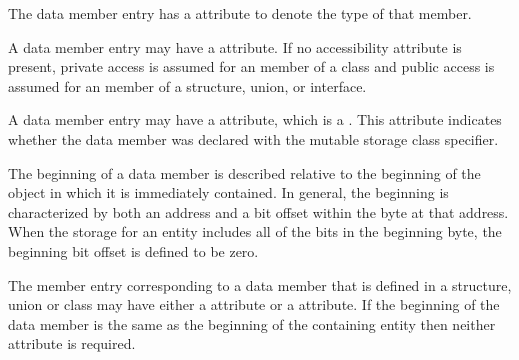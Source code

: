 The data member entry has a 
\bb
\DWATtype{} attribute to denote
\eb
{} the type of that member.

A data member entry may have a 
\bb
\hyperlink{chap:DWATaccessibilityattribute}{\DWATaccessibilityNAME}
\eb
attribute. 
If no accessibility attribute is present, private
access is assumed for an member of a class and public access
is assumed for an member of a structure, union, or interface.

A\hypertarget{chap:DWATmutablemutablepropertyofmemberdata}{}
data member entry 
may have a 
\DWATmutableDEFN{} attribute,
which is a . 
This attribute indicates whether the data
member was declared with the mutable storage class specifier.

The beginning of a data member 
is described relative to
the beginning of the object in which it is immediately
contained. In general, the beginning is characterized by
both an address and a bit offset within the byte at that
address. When the storage for an entity includes all of
the bits in the beginning byte, the beginning bit offset is
defined to be zero.

\bbpareb

The\hypertarget{chap:DWATdatabitoffsetdatamemberbitlocation}{}
member\hypertarget{chap:DWATdatamemberlocationdatamemberlocation}{} 
entry 
corresponding to a data member that is defined
in a structure, union or class may have either a 
\DWATdatamemberlocationDEFN{} attribute
or a \DWATdatabitoffsetDEFN{} attribute. 
If the beginning of the data member is the same as
the beginning of the containing entity then neither attribute
is required.

